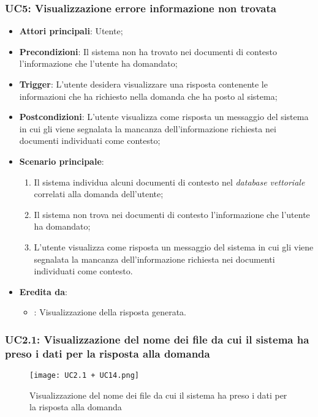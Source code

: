 \subsubsection{UC5: Visualizzazione errore informazione non trovata}
\begin{itemize}
    \item \textbf{Attori principali}: Utente;
    \item \textbf{Precondizioni}: Il sistema non ha trovato nei documenti di contesto l'informazione che l'utente ha domandato;
    \item \textbf{Trigger}: L'utente desidera visualizzare una risposta contenente le informazioni che ha richiesto nella domanda che ha posto al sistema;
    \item \textbf{Postcondizioni}: L'utente visualizza come risposta un messaggio del sistema in cui gli viene segnalata la mancanza dell'informazione 
    richiesta nei documenti individuati come contesto;
    \item \textbf{Scenario principale}:
    \begin{enumerate}
        \item Il sistema individua alcuni documenti di contesto nel \emph{database vettoriale} correlati alla domanda dell'utente;
        \item Il sistema non trova nei documenti di contesto l'informazione che l'utente ha domandato;
        \item L'utente visualizza come risposta un messaggio del sistema in cui gli viene segnalata la mancanza dell'informazione richiesta
        nei documenti individuati come contesto.
    \end{enumerate}
    \item \textbf{Eredita da}:
    \begin{itemize}
        \item {}: Visualizzazione della risposta generata.
    \end{itemize}
\end{itemize}

\newpage

\hypertarget{UC2.1}{}
\subsubsection{UC2.1: Visualizzazione del nome dei file da cui il sistema ha preso i dati per la risposta alla domanda}

\begin{figure}[h]
    \centering
    \texttt{[image: UC2.1 + UC14.png]}
    \caption{Visualizzazione del nome dei file da cui il sistema ha preso i dati per la risposta alla domanda}
\end{figure}

